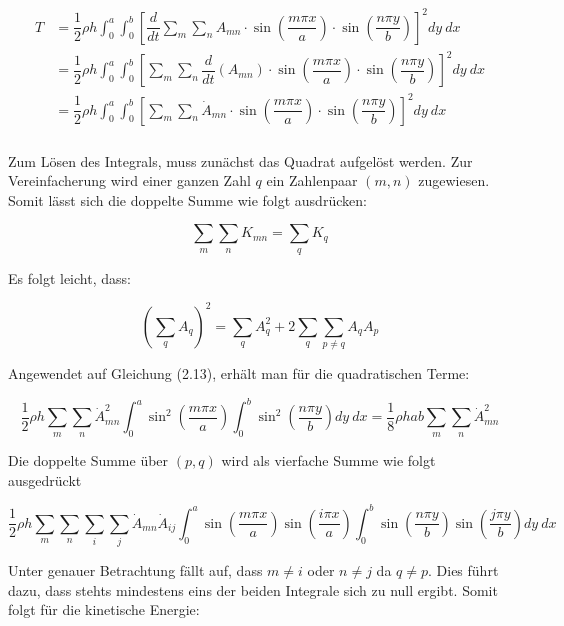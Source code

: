
\begin{align}
\begin{split}
T &= \dfrac{1}{2}\rho h \int_0^a \int_0^b  \left[\dfrac{d}{dt} \sum_m \sum_n A_{mn} \cdot \sin\left(\dfrac{m \pi x}{a}\right) \cdot \sin\left(\dfrac{n \pi y}{b}\right) \right]^2 dy \ dx  \\
&= \dfrac{1}{2} \rho h\int_0^a \int_0^b  \left[ \sum_m \sum_n \dfrac{d}{dt}\left(A_{mn}\right) \cdot \sin\left(\dfrac{m \pi x}{a}\right) \cdot \sin\left(\dfrac{n \pi y}{b}\right) \right]^2 dy \ dx \\
&= \dfrac{1}{2} \rho h \int_0^a \int_0^b  \left[ \sum_m \sum_n \dot{A}_{mn} \cdot \sin\left(\dfrac{m \pi x}{a}\right) \cdot \sin\left(\dfrac{n \pi y}{b}\right) \right]^2 dy \ dx \\
\end{split}
\end{align}

Zum Lösen des Integrals, muss zunächst das Quadrat aufgelöst werden. Zur Vereinfacherung wird einer ganzen Zahl $q$ ein Zahlenpaar $(m,n)$ zugewiesen.
Somit lässt sich die doppelte Summe wie folgt ausdrücken:

$$\sum_m\sum_n K_{mn}=\sum_q K_q$$

Es folgt leicht, dass:

$$\left(\sum_qA_q\right)^2=\sum_qA^2_q+2\sum_q\sum_{p\neq q}A_qA_p$$


Angewendet auf Gleichung (2.13), erhält man für die quadratischen Terme:

\begin{equation}
\dfrac{1}{2}\rho h \sum_m\sum_n \dot{A}^2_{mn}\int_0^a\sin^2\left(\dfrac{m\pi x}{a}\right)\int_0^b\sin^2\left(\dfrac{n\pi y}{b}\right) dy \ dx=\dfrac{1}{8}\rho h a b\sum_m\sum_n \dot{A}^2_{mn}
\end{equation}

Die doppelte Summe über $(p,q)$ wird als vierfache Summe wie folgt ausgedrückt

\begin{equation}
\dfrac{1}{2}\rho h \sum_m\sum_n\sum_i\sum_j \dot{A}_{mn}\dot{A}_{ij}\int_0^a\sin\left(\dfrac{m\pi x}{a}\right)\sin\left(\dfrac{i\pi x}{a}\right)\int_0^b\sin\left(\dfrac{n\pi y}{b}\right)\sin\left(\dfrac{j\pi y}{b}\right) dy \ dx
\end{equation}

Unter genauer Betrachtung fällt auf, dass $m\neq i$ oder $n\neq j$ da $q\neq p$. Dies führt dazu, dass stehts mindestens eins der beiden Integrale sich zu null ergibt. Somit folgt für die kinetische Energie:

